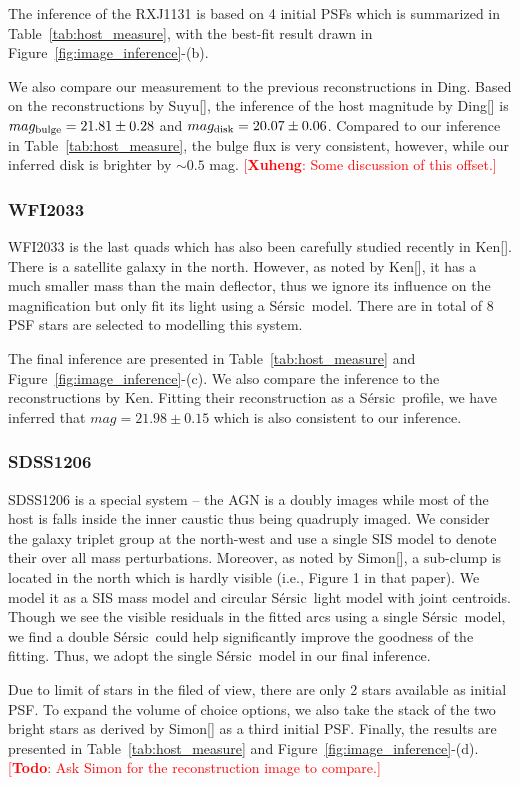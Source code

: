 \documentclass[fleqn,usenatbib]{mnras}
\newcommand{\sersic}{S\'ersic}
\newcommand{\ding}[1]{\textcolor{red}{[{\bf Xuheng}: #1]}}
\newcommand{\todo}[1]{\textcolor{red}{[{\bf Todo}: #1]}}
\begin{document}
The inference of the RXJ1131 is based on 4 initial PSFs which is summarized in Table~\ref{tab:host_measure}, with the best-fit result drawn in Figure~\ref{fig:image_inference}-(b).

We also compare our measurement to the previous reconstructions in Ding. Based on the reconstructions by Suyu[], the inference of the host magnitude by Ding[] is $mag_{\rm bulge} = 21.81 \pm 0.28$ and $mag_{\rm disk} = 20.07\pm0.06$. Compared to our inference in Table~\ref{tab:host_measure}, the bulge flux is very consistent, however, while our inferred disk is brighter by $\sim 0.5$ mag. \ding{Some discussion of this offset.}

\subsubsection{WFI2033}
WFI2033 is the last quads which has also been carefully studied recently in Ken[]. There is a satellite galaxy in the north. However, as noted by Ken[], it has a much smaller mass than the main deflector, thus we ignore its influence on the magnification but only fit its light using a \sersic\ model. There are in total of 8 PSF stars are selected to modelling this system.

The final inference are presented in Table~\ref{tab:host_measure} and Figure~\ref{fig:image_inference}-(c). We also compare the inference to the reconstructions by Ken. Fitting their reconstruction as a \sersic\ profile, we have inferred that $mag = 21.98 \pm 0.15$ which is also consistent to our inference.

\subsubsection{SDSS1206}
SDSS1206 is a special system -- the AGN is a doubly images while most of the host is falls inside the inner caustic thus being quadruply imaged. We consider the galaxy triplet group at the north-west and use a single SIS model to denote their over all mass perturbations. Moreover, as noted by Simon[], a sub-clump is located in the north which is hardly visible  (i.e., Figure 1 in that paper). We model it as a SIS mass model and circular \sersic\ light model with joint centroids. Though we see the visible residuals in the fitted arcs using a single \sersic\ model, we find a double \sersic\ could help significantly improve the goodness of the fitting. Thus, we adopt the single \sersic\ model in our final inference. 

Due to limit of stars in the filed of view, there are only 2 stars available as initial PSF. To expand the volume of choice options, we also take the stack of the two bright stars as derived by Simon[] as a third initial PSF. Finally, the results are presented in Table~\ref{tab:host_measure} and Figure~\ref{fig:image_inference}-(d).
\todo{Ask Simon for the reconstruction image to compare.}
\end{document}
